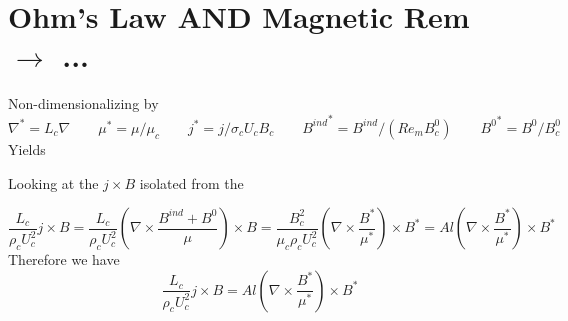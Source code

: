 \documentclass[11pt]{article}
\begin{document}
\section{Ohm's Law AND Magnetic Rem \texorpdfstring{$\rightarrow$}{} ...}
Non-dimensionalizing by
\begin{equation}
	\nabla^* = L_c \nabla \qquad
	\mu^* = \mu / \mu_c \qquad
	j^* = j/ \sigma_c U_c B_c \qquad
	{B^{ind}}^* = B^{ind}/(Re_m B_c^0) \qquad
	{B^0}^* = B^0/B_c^0
\end{equation}
Yields

Looking at the $j \times B$ isolated from the 

\begin{equation}
	 \frac{L_c}{\rho_c U_c^2} j \times B
	 =
	 \frac{L_c}{\rho_c U_c^2} \left( \nabla \times \frac{B^{ind}+B^0}{\mu} \right) \times B
	 =
	\frac{B_c^2}{\mu_c \rho_c U_c^2} \left( \nabla \times \frac{B^*}{\mu^*} \right) \times B^*
	 =
	Al \left( \nabla \times \frac{B^*}{\mu^*} \right) \times B^*
\end{equation}
Therefore we have
\begin{equation}
	\boxed{
	 \frac{L_c}{\rho_c U_c^2} j \times B
	 =
	Al \left( \nabla \times \frac{B^*}{\mu^*} \right) \times B^*
	}
\end{equation}
\end{document}
